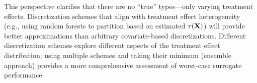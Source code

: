 \documentclass{article}
\newcommand{\PP}{\mathbb{P}}
\begin{document}
This perspective clarifies that there are no ``true'' types---only varying treatment effects. Discretization schemes that align with treatment effect heterogeneity (e.g., using random forests to partition based on estimated $\tau(\mathbf{X})$) will provide better approximations than arbitrary covariate-based discretizations. Different discretization schemes explore different aspects of the treatment effect distribution; using multiple schemes and taking their minimum (ensemble approach) provides a more comprehensive assessment of worst-case surrogate performance.

%
%
%
%
\end{document}
